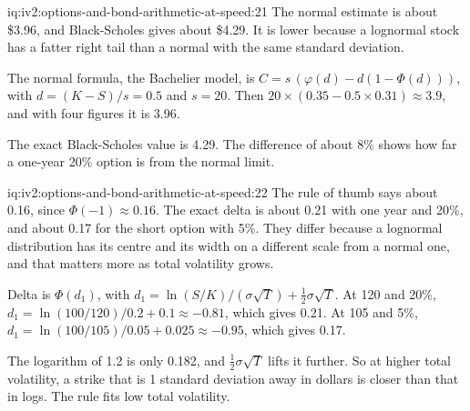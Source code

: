 \begin{solution}{iq:iv2:options-and-bond-arithmetic-at-speed:21}
The normal estimate is about \$3.96, and Black-Scholes gives about \$4.29. It is lower because a lognormal stock has a fatter right tail than a normal with the same standard deviation.

The normal formula, the Bachelier model, is $C = s\,(\varphi(d) - d(1 - \Phi(d)))$, with $d = (K - S)/s = 0.5$ and $s = 20$. Then $20 \times (0.35 - 0.5 \times 0.31) \approx 3.9$, and with four figures it is 3.96.

The exact Black-Scholes value is 4.29. The difference of about 8\% shows how far a one-year 20\% option is from the normal limit.

\end{solution}

\begin{solution}{iq:iv2:options-and-bond-arithmetic-at-speed:22}
The rule of thumb says about 0.16, since $\Phi(-1) \approx 0.16$. The exact delta is about 0.21 with one year and 20\%, and about 0.17 for the short option with 5\%. They differ because a lognormal distribution has its centre and its width on a different scale from a normal one, and that matters more as total volatility grows.

Delta is $\Phi(d_1)$, with $d_1 = \ln(S/K)/(\sigma\sqrt T) + \tfrac12\sigma\sqrt T$. At 120 and 20\%, $d_1 = \ln(100/120)/0.2 + 0.1 \approx -0.81$, which gives 0.21. At 105 and 5\%, $d_1 = \ln(100/105)/0.05 + 0.025 \approx -0.95$, which gives 0.17.

The logarithm of 1.2 is only 0.182, and $\tfrac12\sigma\sqrt T$ lifts it further. So at higher total volatility, a strike that is 1 standard deviation away in dollars is closer than that in logs. The rule fits low total volatility.

\end{solution}

